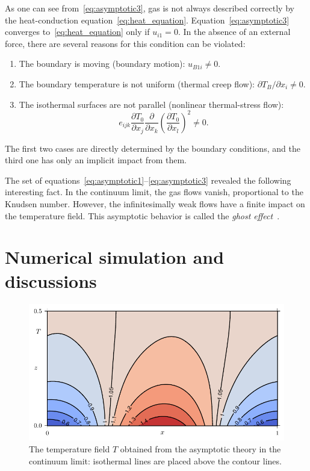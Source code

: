 \documentclass[smallextended, referee]{svjour3} %
\newcommand{\pder}[2][]{\frac{\partial#1}{\partial#2}}
\newcommand{\Pder}[2][]{\partial#1/\partial#2}
\begin{document}
As one can see from~\eqref{eq:asymptotic3}, gas is not always described correctly
by the heat-conduction equation~\eqref{eq:heat_equation}.
Equation~\eqref{eq:asymptotic3} converges to~\eqref{eq:heat_equation} only if \(u_{i1} = 0\).
In the absence of an external force, there are several reasons for this condition can be violated:
\begin{enumerate}
	\item The boundary is moving (boundary motion): \(u_{B1i} \neq 0 \).
	\item The boundary temperature is not uniform (thermal creep flow): \(\Pder[T_B]{x_i} \neq 0 \).
	\item The isothermal surfaces are not parallel (nonlinear thermal-stress flow):
		\begin{equation}\label{eq:equilibrium}
			e_{ijk}\pder[T_0]{x_j}\pder{x_k}\left(\pder[T_0]{x_l}\right)^2 \neq 0.
		\end{equation}
\end{enumerate}
The first two cases are directly determined by the boundary conditions,
and the third one has only an implicit impact from them.

The set of equations~\eqref{eq:asymptotic1}--\eqref{eq:asymptotic3} revealed the following interesting fact.
In the continuum limit, the gas flows vanish, proportional to the Knudsen number.
However, the infinitesimally weak flows have a finite impact on the temperature field.
This asymptotic behavior is called the \emph{ghost effect}~\cite{GhostEffect, Sone2002, Sone2007}.

\section{Numerical simulation and discussions}

\begin{figure}[ht]
	\centering
	\includegraphics{Fig3}
	\caption{The temperature field \(T\) obtained from the asymptotic theory in the continuum limit:
		isothermal lines are placed above the contour lines.}
	\label{fig:moving:T_asym}
\end{figure}
\end{document}
